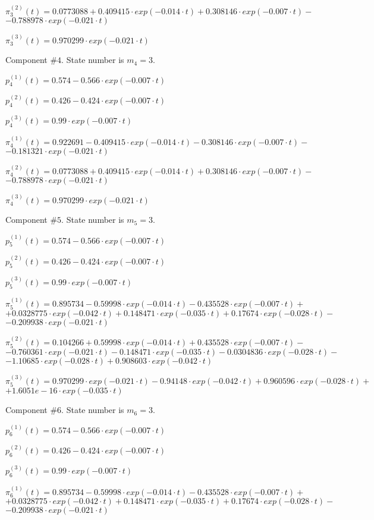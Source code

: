  $\pi^{(2)}_3(t)=0.0773088+0.409415\cdot exp(-0.014\cdot t)+0.308146\cdot exp(-0.007\cdot t)-$
$-0.788978\cdot exp(-0.021\cdot t)$

 $\pi^{(3)}_3(t)=0.970299\cdot exp(-0.021\cdot t)$

 Component #$4$. State number is $m_4=3$.

 $p^{(1)}_4(t)=0.574-0.566\cdot exp(-0.007\cdot t)$

 $p^{(2)}_4(t)=0.426-0.424\cdot exp(-0.007\cdot t)$

 $p^{(3)}_4(t)=0.99\cdot exp(-0.007\cdot t)$

 $\pi^{(1)}_4(t)=0.922691-0.409415\cdot exp(-0.014\cdot t)-0.308146\cdot exp(-0.007\cdot t)-$
$-0.181321\cdot exp(-0.021\cdot t)$

 $\pi^{(2)}_4(t)=0.0773088+0.409415\cdot exp(-0.014\cdot t)+0.308146\cdot exp(-0.007\cdot t)-$
$-0.788978\cdot exp(-0.021\cdot t)$

 $\pi^{(3)}_4(t)=0.970299\cdot exp(-0.021\cdot t)$

 Component #$5$. State number is $m_5=3$.

 $p^{(1)}_5(t)=0.574-0.566\cdot exp(-0.007\cdot t)$

 $p^{(2)}_5(t)=0.426-0.424\cdot exp(-0.007\cdot t)$

 $p^{(3)}_5(t)=0.99\cdot exp(-0.007\cdot t)$

 $\pi^{(1)}_5(t)=0.895734-0.59998\cdot exp(-0.014\cdot t)-0.435528\cdot exp(-0.007\cdot t)+$
$+0.0328775\cdot exp(-0.042\cdot t)+0.148471\cdot exp(-0.035\cdot t)+0.17674\cdot exp(-0.028\cdot t)-$
$-0.209938\cdot exp(-0.021\cdot t)$

 $\pi^{(2)}_5(t)=0.104266+0.59998\cdot exp(-0.014\cdot t)+0.435528\cdot exp(-0.007\cdot t)-$
$-0.760361\cdot exp(-0.021\cdot t)-0.148471\cdot exp(-0.035\cdot t)-0.0304836\cdot exp(-0.028\cdot t)-$
$-1.10685\cdot exp(-0.028\cdot t)+0.908603\cdot exp(-0.042\cdot t)$

 $\pi^{(3)}_5(t)=0.970299\cdot exp(-0.021\cdot t)-0.94148\cdot exp(-0.042\cdot t)+0.960596\cdot exp(-0.028\cdot t)+$
$+1.6051e-16\cdot exp(-0.035\cdot t)$

 Component #$6$. State number is $m_6=3$.

 $p^{(1)}_6(t)=0.574-0.566\cdot exp(-0.007\cdot t)$

 $p^{(2)}_6(t)=0.426-0.424\cdot exp(-0.007\cdot t)$

 $p^{(3)}_6(t)=0.99\cdot exp(-0.007\cdot t)$

 $\pi^{(1)}_6(t)=0.895734-0.59998\cdot exp(-0.014\cdot t)-0.435528\cdot exp(-0.007\cdot t)+$
$+0.0328775\cdot exp(-0.042\cdot t)+0.148471\cdot exp(-0.035\cdot t)+0.17674\cdot exp(-0.028\cdot t)-$
$-0.209938\cdot exp(-0.021\cdot t)$

